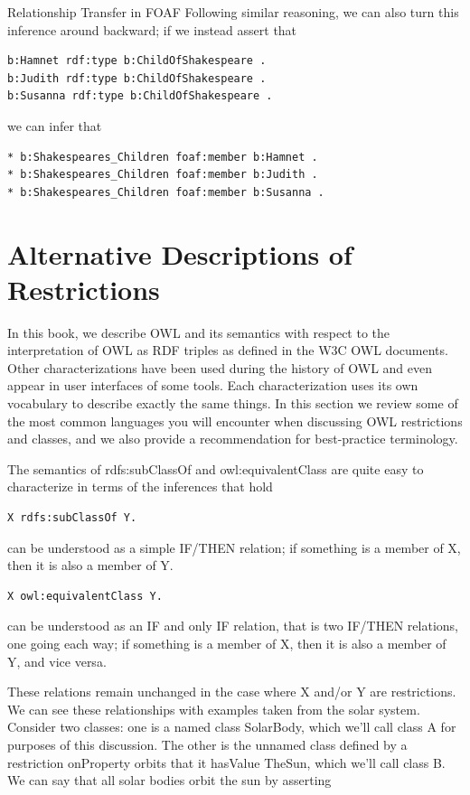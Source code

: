 \begin{challenge} {Relationship Transfer in FOAF}
Following similar reasoning, we can also turn this inference around
backward; if we instead assert that

\begin{lstlisting}
b:Hamnet rdf:type b:ChildOfShakespeare .
b:Judith rdf:type b:ChildOfShakespeare .
b:Susanna rdf:type b:ChildOfShakespeare .
\end{lstlisting}

we can infer that

\begin{lstlisting}
* b:Shakespeares_Children foaf:member b:Hamnet .
* b:Shakespeares_Children foaf:member b:Judith .
* b:Shakespeares_Children foaf:member b:Susanna .
\end{lstlisting}
\end{challenge}

\section{Alternative Descriptions of Restrictions}

In this book, we describe OWL and its semantics with respect to the
interpretation of OWL as RDF triples as defined in the W3C OWL
documents. Other characterizations have been used during the history of
OWL and even appear in user interfaces of some tools. Each
characterization uses its own vocabulary to describe exactly the same
things. In this section we review some of the most common
languages you will encounter when discussing OWL restrictions and
classes, and we also provide a recommendation for best-practice
terminology.

The semantics of rdfs:subClassOf and owl:equivalentClass are quite easy
to characterize in terms of the inferences that hold

\begin{lstlisting}
X rdfs:subClassOf Y.
\end{lstlisting}

can be understood as a simple IF/THEN relation; if something is a member
of X, then it is also a member of Y.

\begin{lstlisting}
X owl:equivalentClass Y.
\end{lstlisting}

can be understood as an IF and only IF relation, that is two IF/THEN
relations, one going each way; if something is a member of X, then it is
also a member of Y, and vice versa.

These relations remain unchanged in the case where X and/or Y are
restrictions. We can see these relationships with examples taken from
the solar system. Consider two classes: one is a named class SolarBody,
which we'll call class A for purposes of this discussion. The other is
the unnamed class defined by a restriction onProperty orbits that it
hasValue TheSun, which we'll call class B. We can say that all solar
bodies orbit the sun by asserting

